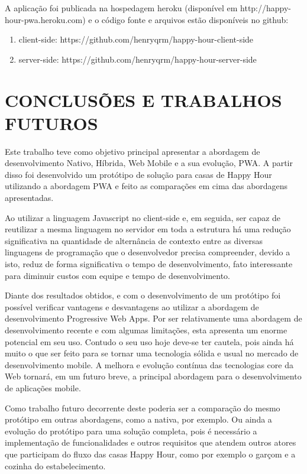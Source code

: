 A aplicação foi publicada na hospedagem heroku (disponível em http://happy-hour-pwa.heroku.com) e o código fonte e arquivos estão disponíveis no github:

\begin{enumerate}
	\item client-side: https://github.com/henryqrm/happy-hour-client-side
	\item server-side: https://github.com/henryqrm/happy-hour-server-side
\end{enumerate}

\section{\esp CONCLUSÕES E TRABALHOS FUTUROS}

Este trabalho teve como objetivo principal apresentar a abordagem de desenvolvimento Nativo, Híbrida, Web Mobile e a sua evolução, PWA. A partir disso foi desenvolvido um protótipo de solução para casas de Happy Hour utilizando a abordagem PWA e feito as comparações em cima das abordagens apresentadas.

Ao utilizar a linguagem Javascript no client-side e, em seguida, ser capaz de reutilizar a mesma linguagem no servidor em toda a estrutura há uma redução significativa na quantidade de alternância de contexto entre as diversas linguagens de programação que o desenvolvedor precisa compreender, devido a isto, reduz de forma significativa o tempo de desenvolvimento, fato interessante para diminuir custos com equipe e tempo de desenvolvimento.

Diante dos resultados obtidos, e com o desenvolvimento de um protótipo foi possível verificar vantagens e desvantagens ao utilizar a abordagem de desenvolvimento Progressive Web Apps. Por ser relativamente uma abordagem de desenvolvimento recente e com algumas limitações, esta apresenta um enorme potencial em seu uso. Contudo o seu uso hoje deve-se ter cautela, pois ainda há muito o que ser feito para se tornar uma tecnologia sólida e usual no mercado de desenvolvimento mobile. A melhora e evolução contínua das tecnologias core da Web tornará, em um futuro breve, a principal abordagem para o desenvolvimento de aplicações mobile.

Como trabalho futuro decorrente deste poderia ser a comparação do mesmo protótipo em outras abordagens, como a nativa, por exemplo. Ou ainda a evolução do protótipo para uma solução completa, pois é necessário a implementação de funcionalidades e outros requisitos que atendem outros atores que participam do fluxo das casas Happy Hour, como por exemplo o garçom e a cozinha do estabelecimento.

















